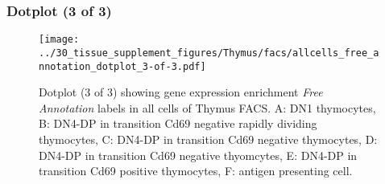 \clearpage

\subsubsection{Dotplot (3 of 3)}
\begin{figure}[h]
\centering
\texttt{[image: ../30\_tissue\_supplement\_figures/Thymus/facs/allcells\_free\_annotation\_dotplot\_3-of-3.pdf]}

\caption{ Dotplot (3 of 3)  showing gene expression enrichment \emph{Free Annotation} labels in all cells of Thymus FACS. A: DN1 thymocytes, B: DN4-DP in transition Cd69 negative rapidly dividing thymocytes, C: DN4-DP in transition Cd69 negative thymocytes, D: DN4-DP in transition Cd69 negative thyomcytes, E: DN4-DP in transition Cd69 positive thymocytes, F: antigen presenting cell.}
\end{figure}

